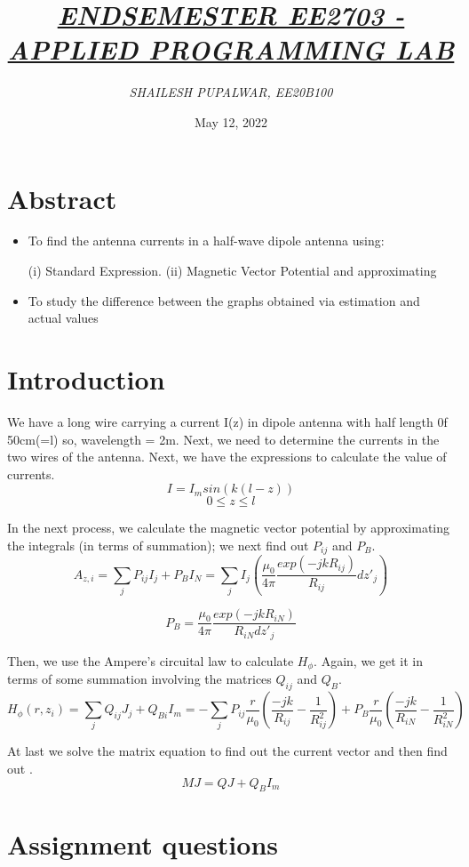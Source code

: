 \documentclass{article}
\title{\underline{\textit{\Large{ ENDSEMESTER EE2703 - APPLIED PROGRAMMING LAB  }}}}
\author{\textit{ SHAILESH PUPALWAR, EE20B100 }}
\date{May 12, 2022}
\begin{document}
\maketitle

\section{Abstract}
\begin{itemize}
\item To find the antenna currents in a half-wave dipole antenna using:

(i) Standard Expression.
(ii) Magnetic Vector Potential and approximating
\item To study the difference between the graphs obtained via estimation and actual values
\end{itemize}

\section{Introduction}
We have a long wire carrying a current I(z) in dipole antenna with half length 0f 50cm(=l)
so, wavelength = 2m. Next, we need to determine the currents in the two wires of the antenna. Next, we have the expressions to calculate the value of currents.
$$I = I_{m}sin(k(l-z)) $$$$  0\leq z \leq l$$


In the next process, we calculate the magnetic vector potential by approximating the integrals (in terms of summation); we next find out $P_{ij}$ and $P_{B}$.
$$A_{z,i} = \sum_{j}P_{ij}I_{j} + P_{B}I_{N} = \sum_{j}I_{j}(\frac{\mu_{0}}{4\pi}\frac{exp(-jkR_{ij})}{R_{ij}}dz'_{j})$$

$$P_{B} = \frac{\mu_{0}}{4\pi}\frac{exp(-jkR_{iN})}{R_{iN}dz'_{j}}$$

Then, we use the Ampere's circuital law to calculate $H_{\phi}$. Again, we get it in terms of some summation involving the matrices $Q_{ij}$ and $Q_{B}$. 
$$H_{\phi}(r,z_{i}) = \sum_{j}Q_{ij}J_{j} + Q_{Bi}I_{m} = -\sum_{j}P_{ij}\frac{r}{\mu_{0}}(\frac{-jk}{R_{ij}} - \frac{1}{R^2_{ij}}) + P_{B}\frac{r}{\mu_{0}}(\frac{-jk}{R_{iN}} - \frac{1}{R^2_{iN}})$$


At last we solve the matrix equation to find out the current vector  and then find out .
$$MJ = QJ + Q_{B}I_{m}$$

\section{Assignment questions}
\end{document}
